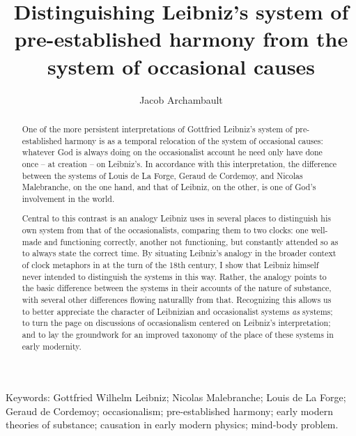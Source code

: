 \documentclass{article}
\title{Distinguishing Leibniz's system of pre-established harmony from the system of occasional causes}
\author{Jacob Archambault}
\begin{document}
\maketitle

  
\begin{abstract}
One of the more persistent interpretations of Gottfried Leibniz's system of pre-established harmony is as a temporal relocation of the system of occasional causes: whatever God is always doing on the occasionalist account he need only have done once -- at creation -- on Leibniz's. In accordance with this interpretation, the difference between the systems of Louis de La Forge, Geraud de Cordemoy, and Nicolas Malebranche, on the one hand, and that of Leibniz, on the other, is one of God's involvement in the world. 

Central to this contrast is an analogy Leibniz uses in several places to distinguish his own system from that of the occasionalists, comparing them to two clocks: one well-made and functioning correctly, another not functioning, but constantly attended so as to always state the correct time. By situating Leibniz's analogy in the broader context of clock metaphors in at the turn of the 18th century, I show that Leibniz himself never intended to distinguish the systems in this way. Rather, the analogy points to the basic difference between the systems in their accounts of the nature of substance, with several other differences flowing naturallly from that. Recognizing this allows us to better appreciate the character of Leibnizian and occasionalist systems \emph{as} systems; to turn the page on discussions of occasionalism centered on Leibniz's interpretation; and to lay the groundwork for an improved taxonomy of the place of these systems in early modernity.
\end{abstract}

Keywords: Gottfried Wilhelm Leibniz; Nicolas Malebranche; Louis de La Forge; Geraud de Cordemoy; occasionalism; pre-established harmony; early modern theories of substance; causation in early modern physics; mind-body problem.
\end{document}
